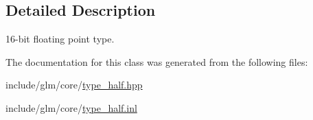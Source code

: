 \subsection{\-Detailed \-Description}
16-\/bit floating point type. 

\-The documentation for this class was generated from the following files\-:\begin{DoxyCompactItemize}
\item 
include/glm/core/\hyperlink{type__half_8hpp}{type\-\_\-half.\-hpp}\item 
include/glm/core/\hyperlink{type__half_8inl}{type\-\_\-half.\-inl}\end{DoxyCompactItemize}
